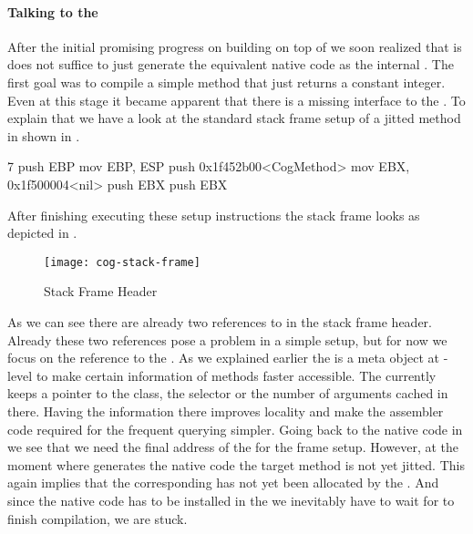 \paragraph{Talking to the \JIT}
After the initial promising progress on building \NBJ on top of \B we soon realized that is does not suffice to just generate the equivalent native code as the \VM internal \JIT.
The first goal was to compile a simple method that just returns a constant integer.
Even at this stage it became apparent that there is a missing interface to the \JIT.
To explain that we have a look at the standard stack frame setup of a jitted method in \Cog shown in .
%
\begin{numstcode}[
	caption={\Cog \JIT Stackframe Setup},
	label={lst:val-nabujito-cog-frame}]{7}
push EBP
mov  EBP, ESP
push 0x1f452b00<CogMethod>
mov  EBX, 0x1f500004<nil>
push EBX
push EBX
\end{numstcode} 
%
After finishing executing these setup instructions the stack frame looks as depicted in .
%
\begin{figure}[h]
	\centering
	\texttt{[image: cog-stack-frame]}
	\caption{\Cog Stack Frame Header}
\end{figure}
%
As we can see there are already two references to  in the stack frame header.
Already these two references pose a problem in a simple \NBJ setup, but for now we focus on the reference to the .
As we explained earlier the  is a meta object at \JIT-level to make certain information of \PH methods faster accessible.
The \VM currently keeps a pointer to the class, the selector or the number of arguments cached in there.
Having the information there improves locality and make the assembler code required for the frequent querying simpler.
Going back to the native code in  we see that we need the final address of the  for the frame setup.
However, at the moment where \NBJ generates the native code the target method is not yet jitted.
This again implies that the corresponding  has not yet been allocated by the \JIT.
And since the native code has to be installed in the \JIT we inevitably have to wait for \NBJ to finish compilation, we are stuck.


